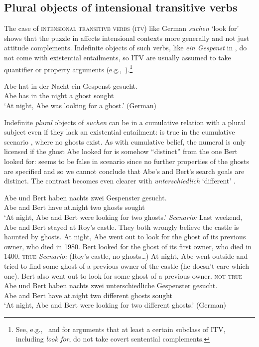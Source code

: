 \documentclass[output=paper]{langscibook}
\begin{document}
\subsection{Plural objects of intensional transitive verbs}

The case of  \textsc{intensional transitive verbs (itv)}  like  German \textit{suchen} `look for' shows that 
 the puzzle in  affects intensional contexts more generally and not just attitude complements. Indefinite objects of such verbs, like \textit{ein Gespenst} in , do not come with existential entailments, so ITV are usually assumed to take quantifier or property arguments (e.g.,~\citealt{Montague:1974,Zimmermann:1993}).\footnote{See, e.g.,~\citet{Schwarz:2021} and \citet{Deal:2008} for arguments that at least a certain subclass of ITV, including \textit{look for}, do not take covert sentential complements.} 

\ea \label{sch-has:ex:12} {\gll Abe hat in der Nacht ein Gespenst gesucht. \\
Abe has in the night a ghost sought \\
\glt `At night, Abe was looking for a ghost.' \hfill (German)}  \z

\noindent Indefinite \textit{plural} objects of \textit{suchen} can be in a cumulative relation with a plural subject even if they lack an existential entailment:  is true in the cumulative scenario , where no ghosts exist. As with cumulative belief, the numeral is only licensed if the ghost Abe looked for is somehow ``distinct'' from the one Bert looked for:  seems to be false in scenario  since no further properties of the ghosts are specified and so we cannot conclude that Abe's and Bert's search goals are distinct. The contrast becomes even clearer with \textit{unterschiedlich} `different' .

\eanoraggedright \label{sch-has:ex:9ff}
\eanoraggedright \label{sch-has:ex:10} {\gll Abe und Bert haben nachts zwei Gespenster gesucht. \\
Abe and Bert have at.night two ghosts sought \\
\glt `At night, Abe and Bert were looking for two ghosts.'}
\ex \label{sch-has:ex:9} \textit{Scenario:} Last weekend, Abe and Bert stayed at Roy's castle. They both wrongly believe the castle is haunted by ghosts. At night, Abe went out to look for the ghost of its previous owner, who died in 1980. Bert looked for the ghost of its first owner, who died in 1400.\hfill {} \textsc{true}
\ex \label{sch-has:ex:11} \textit{Scenario:} (Roy's castle, no ghosts\ldots) At night, Abe went outside and tried to find some ghost of a previous owner of the castle (he doesn't care which one). Bert also went out to look for some ghost of a previous owner. \hfill {} \textsc{not true}
\z\ex \label{sch-has:ex:17} \gll Abe und Bert haben nachts zwei unterschiedliche Gespenster gesucht.\\
Abe and Bert have at.night two different ghosts sought\\
\glt `At night, Abe and Bert were looking for two different ghosts.' \hfill (German) \z
\end{document}
